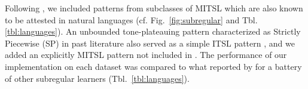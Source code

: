 \documentclass[11pt]{article}
\begin{document}
  Following  \citep{aksenova2020tool}, we included patterns from subclasses of MITSL which are also known to be attested in natural languages (cf. Fig.\ \ref{fig:subregular} and Tbl.\ref{tbl:languages}).
  An unbounded tone-plateauing pattern \citep{hyman2010tone,Jardine16} characterized as Strictly Piecewise (SP)  in past literature also served as a simple ITSL pattern \citep{de2019structure}, and we added an explicitly MITSL pattern not included in \citep{aksenova2020tool}.
        The performance of our implementation on each dataset was compared to what reported by \citet[][]{aksenova2020tool} for a battery of other subregular learners (Tbl.\ \ref{tbl:languages}).\@

\end{document}
